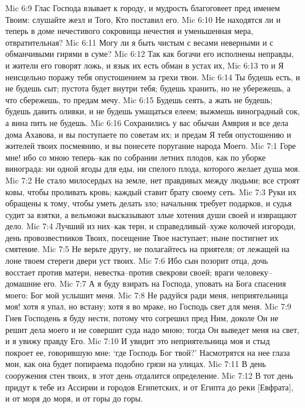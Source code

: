 Mic 6:9  Глас Господа взывает к городу, и мудрость благоговеет пред именем Твоим: слушайте жезл и Того, Кто поставил его.
Mic 6:10  Не находятся ли и теперь в доме нечестивого сокровища нечестия и уменьшенная мера, отвратительная?
Mic 6:11  Могу ли я быть чистым с весами неверными и с обманчивыми гирями в суме?
Mic 6:12  Так как богачи его исполнены неправды, и жители его говорят ложь, и язык их есть обман в устах их,
Mic 6:13  то и Я неисцельно поражу тебя опустошением за грехи твои.
Mic 6:14  Ты будешь есть, и не будешь сыт; пустота будет внутри тебя; будешь хранить, но не убережешь, а что сбережешь, то предам мечу.
Mic 6:15  Будешь сеять, а жать не будешь; будешь давить оливки, и не будешь умащаться елеем; выжмешь виноградный сок, а вина пить не будешь.
Mic 6:16  Сохранились у вас обычаи Амврия и все дела дома Ахавова, и вы поступаете по советам их; и предам Я тебя опустошению и жителей твоих посмеянию, и вы понесете поругание народа Моего.
Mic 7:1  Горе мне! ибо со мною теперь--как по собрании летних плодов, как по уборке винограда: ни одной ягоды для еды, ни спелого плода, которого желает душа моя.
Mic 7:2  Не стало милосердых на земле, нет правдивых между людьми; все строят ковы, чтобы проливать кровь; каждый ставит брату своему сеть.
Mic 7:3  Руки их обращены к тому, чтобы уметь делать зло; начальник требует подарков, и судья судит за взятки, а вельможи высказывают злые хотения души своей и извращают дело.
Mic 7:4  Лучший из них--как терн, и справедливый--хуже колючей изгороди, день провозвестников Твоих, посещение Твое наступает; ныне постигнет их смятение.
Mic 7:5  Не верьте другу, не полагайтесь на приятеля; от лежащей на лоне твоем стереги двери уст твоих.
Mic 7:6  Ибо сын позорит отца, дочь восстает против матери, невестка--против свекрови своей; враги человеку--домашние его.
Mic 7:7  А я буду взирать на Господа, уповать на Бога спасения моего: Бог мой услышит меня.
Mic 7:8  Не радуйся ради меня, неприятельница моя! хотя я упал, но встану; хотя я во мраке, но Господь свет для меня.
Mic 7:9  Гнев Господень я буду нести, потому что согрешил пред Ним, доколе Он не решит дела моего и не совершит суда надо мною; тогда Он выведет меня на свет, и я увижу правду Его.
Mic 7:10  И увидит это неприятельница моя и стыд покроет ее, говорившую мне: `где Господь Бог твой?' Насмотрятся на нее глаза мои, как она будет попираема подобно грязи на улицах.
Mic 7:11  В день сооружения стен твоих, в этот день отдалится определение.
Mic 7:12  В тот день придут к тебе из Ассирии и городов Египетских, и от Египта до реки [Евфрата], и от моря до моря, и от горы до горы.
